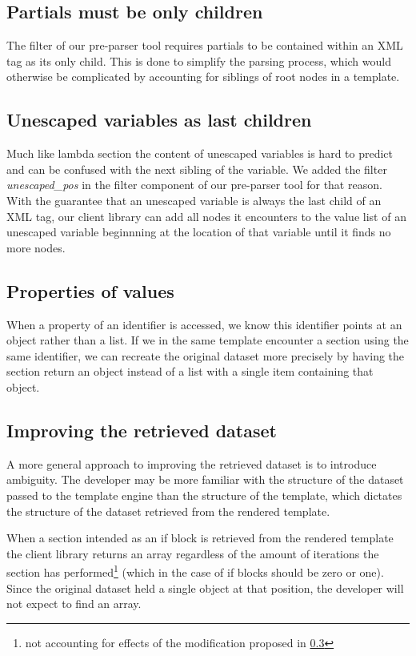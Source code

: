 \documentclass[thesis.tex]{subfiles}
\begin{document}
\subsection{Partials must be only children}
\label{sec:partial-only-child}
The filter of our pre-parser tool requires partials to be contained within an
XML tag as its only child. This is done to simplify the parsing process, which
would otherwise be complicated by accounting for siblings of root nodes in
a template.

\subsection{Unescaped variables as last children}
\label{sec:unescaped-variable-filter}
Much like lambda section the content of unescaped variables is hard to predict
and can be confused with the next sibling of the variable. We added the filter
\emph{unescaped\_pos} in the filter component of our pre-parser tool for that
reason. With the guarantee that an unescaped variable is always the last child
of an XML tag, our client library can add all nodes it encounters to the value
list of an unescaped variable beginnning at the location of that variable until
it finds no more nodes.

\subsection{Properties of values}
\label{sec:flatten-section}
When a property of an identifier is accessed, we know this identifier points at
an object rather than a list. If we in the same template encounter a section
using the same identifier, we can recreate the original dataset more precisely
by having the section return an object instead of a list with a single item
containing that object.

\subsection{Improving the retrieved dataset}
A more general approach to improving the retrieved dataset is to introduce
ambiguity. The developer may be more familiar with the structure of the dataset
passed to the template engine than the structure of the template, which dictates
the structure of the dataset retrieved from the rendered template.

When a section intended as an if block is retrieved from the rendered template
the client library returns an array regardless of the amount of iterations the
section has performed\footnote{
	not accounting for effects of the modification proposed in \ref{sec:flatten-section}
} (which in the case of if blocks should be zero or one).
Since the original dataset held a single object at that position,
the developer will not expect to find an array.
\end{document}

